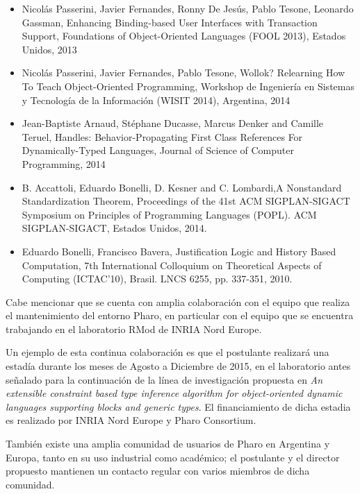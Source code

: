 \documentclass[a4paper,10pt]{article}
\begin{document}
\begin{itemize}
 \item Nicolás Passerini, Javier Fernandes, Ronny De Jesús, Pablo Tesone, Leonardo Gassman, Enhancing Binding-based User Interfaces with Transaction Support, Foundations of Object-Oriented Languages (FOOL 2013), Estados Unidos, 2013
 
 \item Nicolás Passerini, Javier Fernandes, Pablo Tesone, Wollok? Relearning How To Teach Object-Oriented Programming, Workshop de Ingeniería en Sistemas y Tecnología de la Información (WISIT 2014), Argentina, 2014
 
 \item Jean-Baptiste Arnaud, Stéphane Ducasse, Marcus Denker and Camille Teruel, Handles: Behavior-Propagating First Class References For Dynamically-Typed Languages, Journal of Science of Computer Programming, 2014
 
 \item B. Accattoli,  Eduardo Bonelli, D. Kesner and C. Lombardi,A Nonstandard Standardization Theorem, Proceedings of the 41st ACM SIGPLAN-SIGACT Symposium on Principles of Programming Languages (POPL). ACM SIGPLAN-SIGACT, Estados Unidos, 2014.
 
 \item Eduardo Bonelli, Francisco Bavera, Justification Logic and History Based Computation, 7th International Colloquium on Theoretical Aspects of Computing (ICTAC'10), Brasil. LNCS 6255, pp. 337-351, 2010.
\end{itemize}

\medskip
Cabe mencionar que se cuenta con amplia colaboración con el equipo que realiza el mantenimiento del entorno Pharo, en particular con el equipo que se encuentra trabajando en el laboratorio RMod de INRIA Nord Europe. 

Un ejemplo de esta continua colaboración es que el postulante realizará una estadía durante los meses de Agosto a Diciembre de 2015, en el laboratorio antes señalado para la continuación de la línea de investigación propuesta en \emph{An extensible constraint based type inference algorithm for object-oriented dynamic languages supporting blocks and generic types}. El financiamiento de dicha estadia es realizado por INRIA Nord Europe y Pharo Consortium.

También existe una amplia comunidad de usuarios de Pharo en Argentina y Europa, tanto en su uso industrial como académico; el postulante y el director propuesto mantienen un contacto regular con varios miembros de dicha comunidad.
\end{document}
